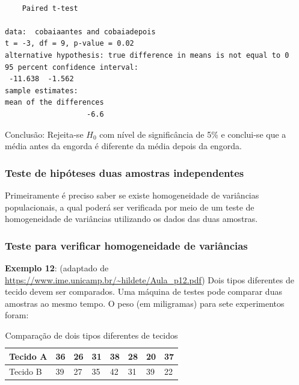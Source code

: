 \documentclass[12pt,brazil,oneside]{book}
\begin{document}
\begin{verbatim}

    Paired t-test

data:  cobaiaantes and cobaiadepois
t = -3, df = 9, p-value = 0.02
alternative hypothesis: true difference in means is not equal to 0
95 percent confidence interval:
 -11.638  -1.562
sample estimates:
mean of the differences 
                   -6.6 
\end{verbatim}

Conclusão: Rejeita-se \(H_0\) com nível de significância de 5\% e conclui-se que a média antes da engorda é diferente da média depois da engorda.

\hypertarget{teste-de-hipoteses-duas-amostras-independentes}{%
\subsubsection{Teste de hipóteses duas amostras independentes}\label{teste-de-hipoteses-duas-amostras-independentes}}

Primeiramente é preciso saber se existe homogeneidade de variâncias populacionais, a qual poderá ser verificada por meio de um teste de homogeneidade de variâncias utilizando os dados das duas amostras.

\hypertarget{teste-para-verificar-homogeneidade-de-variancias}{%
\subsubsection{Teste para verificar homogeneidade de variâncias}\label{teste-para-verificar-homogeneidade-de-variancias}}

\textbf{Exemplo 12}: (adaptado de \url{https://www.ime.unicamp.br/~hildete/Aula_p12.pdf}) Dois tipos diferentes de tecido devem ser comparados. Uma máquina de testes pode comparar duas amostras ao mesmo tempo. O peso (em miligramas) para sete experimentos foram:

\begin{table}[t]

\caption{\label{tab:unnamed-chunk-151}Comparação de dois tipos diferentes de tecidos}
\centering
\begin{tabular}{l|l|l|l|l|l|l|l}
\hline
Tecido A & 36 & 26 & 31 & 38 & 28 & 20 & 37\\
\hline
Tecido B & 39 & 27 & 35 & 42 & 31 & 39 & 22\\
\hline
\end{tabular}
\end{table}
\end{document}
